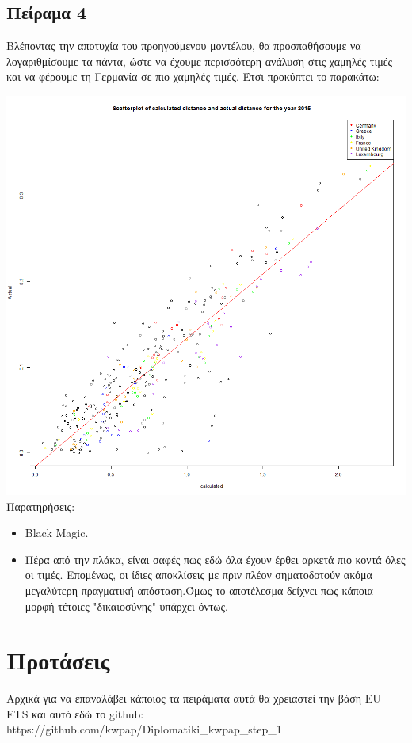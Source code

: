 \documentclass[a4paper,twoside,10pt]{article}
\begin{document}
	\subsection{Πείραμα 4}
	Βλέποντας την αποτυχία του προηγούμενου μοντέλου, θα προσπαθήσουμε να λογαριθμίσουμε τα πάντα, ώστε να έχουμε περισσότερη ανάλυση στις χαμηλές τιμές και να φέρουμε τη Γερμανία σε πιο χαμηλές τιμές. Έτσι προκύπτει το παρακάτω:
	
	\includegraphics[width = \textwidth]{images/scatterplot_with_regression_line_ 2015 _with_all_data_and_log= TRUE .png}
	Παρατηρήσεις:
	\begin{itemize}
		\item Black Magic.
		\item Πέρα από την πλάκα, είναι σαφές πως εδώ όλα έχουν έρθει αρκετά πιο κοντά όλες οι τιμές. Επομένως, οι ίδιες αποκλίσεις με πριν πλέον σηματοδοτούν ακόμα μεγαλύτερη πραγματική απόσταση.Όμως το αποτέλεσμα δείχνει πως κάποια μορφή τέτοιες "δικαιοσύνης" υπάρχει όντως. 
	\end{itemize}
	
	\section{Προτάσεις}
	
	Αρχικά για να επαναλάβει κάποιος τα πειράματα αυτά θα χρειαστεί την βάση EU ETS και αυτό εδώ το github: https://github.com/kwpap/Diplomatiki\_kwpap\_step\_1
	
\end{document}
